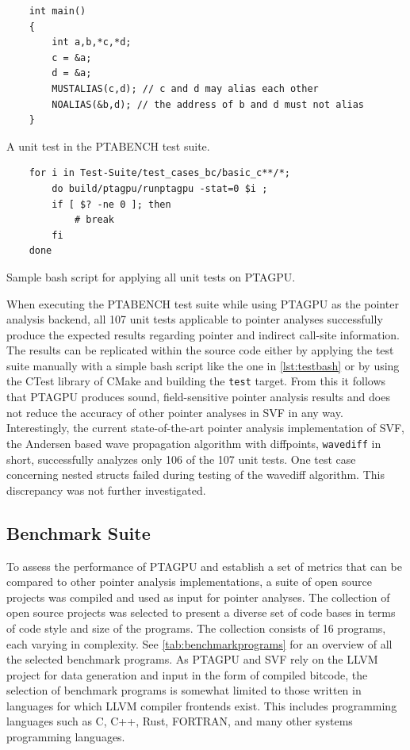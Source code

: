 \begin{listing}
    \begin{verbatim}
    int main()
    {
        int a,b,*c,*d;
        c = &a;
        d = &a;
        MUSTALIAS(c,d); // c and d may alias each other
        NOALIAS(&b,d); // the address of b and d must not alias
    }
        \end{verbatim}
    \caption{A unit test in the PTABENCH test suite.}
    \label{lst:testcase}
\end{listing}

\begin{listing}
    \begin{verbatim}
    for i in Test-Suite/test_cases_bc/basic_c**/*; 
        do build/ptagpu/runptagpu -stat=0 $i ; 
        if [ $? -ne 0 ]; then
            # break
        fi
    done
    \end{verbatim}
    \caption{Sample bash script for applying all unit tests on PTAGPU.}
    \label{lst:testbash}
\end{listing}

When executing the PTABENCH test suite while using PTAGPU as the pointer analysis backend, all 107 unit tests applicable to pointer analyses successfully produce the expected results regarding pointer and indirect call-site information.
The results can be replicated within the source code either by applying the test suite manually with a simple bash script like the one in \autoref{lst:testbash} or by using the CTest library of CMake and building the \verb|test| target.
From this it follows that PTAGPU produces sound, field-sensitive pointer analysis results and does not reduce the accuracy of other pointer analyses in SVF in any way.
Interestingly, the current state-of-the-art pointer analysis implementation of SVF, the Andersen based wave propagation algorithm with diffpoints, \texttt{wavediff} in short, successfully analyzes only 106 of the 107 unit tests.
One test case concerning nested structs failed during testing of the wavediff algorithm. This discrepancy was not further investigated.

\subsection{Benchmark Suite}
To assess the performance of PTAGPU and establish a set of metrics that can be compared to other pointer analysis implementations, a suite of open source projects was compiled and used as input for pointer analyses.
The collection of open source projects was selected to present a diverse set of code bases in terms of code style and size of the programs.
The collection consists of 16 programs, each varying in complexity. See \autoref{tab:benchmarkprograms} for an overview of all the selected benchmark programs.
As PTAGPU and SVF rely on the LLVM project for data generation and input in the form of compiled bitcode, the selection of benchmark programs is somewhat limited to those written in languages for which LLVM compiler frontends exist. This includes programming languages such as C, C++, Rust, FORTRAN, and many other systems programming languages.


